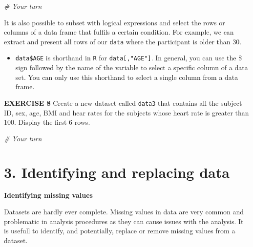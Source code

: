 \documentclass[
]{article}
\newenvironment{Shaded}{\begin{snugshade}}{\end{snugshade}}
\newcommand{\CommentTok}[1]{\textcolor[rgb]{0.56,0.35,0.01}{\textit{#1}}}
\newcommand{\DecValTok}[1]{\textcolor[rgb]{0.00,0.00,0.81}{#1}}
\newcommand{\FunctionTok}[1]{\textcolor[rgb]{0.00,0.00,0.00}{#1}}
\newcommand{\NormalTok}[1]{#1}
\newcommand{\SpecialCharTok}[1]{\textcolor[rgb]{0.00,0.00,0.00}{#1}}
\providecommand{\tightlist}{%
  \setlength{\itemsep}{0pt}\setlength{\parskip}{0pt}}
\begin{document}
\begin{Shaded}
\begin{Highlighting}[]
\CommentTok{\# Your turn}
\end{Highlighting}
\end{Shaded}

It is also possible to subset with logical expressions and select the
rows or columns of a data frame that fulfils a certain condition. For
example, we can extract and present all rows of our \texttt{data} where
the participant is older than 30.

\begin{Shaded}
\end{Shaded}

\begin{itemize}
\tightlist
\item
  \texttt{data\$AGE} is shorthand in \texttt{R} for
  \texttt{data{[},"AGE"{]}}. In general, you can use the \$ sign
  followed by the name of the variable to select a specific column of a
  data set. You can only use this shorthand to select a single column
  from a data frame.
\end{itemize}

\textbf{EXERCISE 8} Create a new dataset called \texttt{data3} that
contains all the subject ID, sex, age, BMI and hear rates for the
subjects whose heart rate is greater than 100. Display the first 6 rows.

\begin{Shaded}
\begin{Highlighting}[]
\CommentTok{\# Your turn}
\end{Highlighting}
\end{Shaded}

\hypertarget{identifying-and-replacing-data}{%
\section{3. Identifying and replacing
data}\label{identifying-and-replacing-data}}

\textbf{Identifying missing values}

Datasets are hardly ever complete. Missing values in data are very
common and problematic in analysis procedures as they can cause issues
with the analysis. It is usefull to identify, and potentially, replace
or remove missing values from a dataset.
\end{document}
